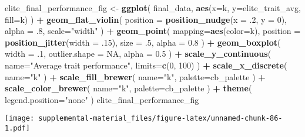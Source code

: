 \documentclass[]{book}
\newenvironment{Shaded}{\begin{snugshade}}{\end{snugshade}}
\newcommand{\DataTypeTok}[1]{\textcolor[rgb]{0.13,0.29,0.53}{#1}}
\newcommand{\DecValTok}[1]{\textcolor[rgb]{0.00,0.00,0.81}{#1}}
\newcommand{\FloatTok}[1]{\textcolor[rgb]{0.00,0.00,0.81}{#1}}
\newcommand{\KeywordTok}[1]{\textcolor[rgb]{0.13,0.29,0.53}{\textbf{#1}}}
\newcommand{\NormalTok}[1]{#1}
\newcommand{\OperatorTok}[1]{\textcolor[rgb]{0.81,0.36,0.00}{\textbf{#1}}}
\newcommand{\OtherTok}[1]{\textcolor[rgb]{0.56,0.35,0.01}{#1}}
\newcommand{\StringTok}[1]{\textcolor[rgb]{0.31,0.60,0.02}{#1}}
\begin{document}
\begin{Shaded}
\begin{Highlighting}[]
\NormalTok{elite_final_performance_fig <-}\StringTok{ }\KeywordTok{ggplot}\NormalTok{(}
\NormalTok{    final_data,}
    \KeywordTok{aes}\NormalTok{(}\DataTypeTok{x=}\NormalTok{k, }\DataTypeTok{y=}\NormalTok{elite_trait_avg, }\DataTypeTok{fill=}\NormalTok{k)}
\NormalTok{  ) }\OperatorTok{+}
\StringTok{  }\KeywordTok{geom_flat_violin}\NormalTok{(}
    \DataTypeTok{position =} \KeywordTok{position_nudge}\NormalTok{(}\DataTypeTok{x =} \FloatTok{.2}\NormalTok{, }\DataTypeTok{y =} \DecValTok{0}\NormalTok{),}
    \DataTypeTok{alpha =} \FloatTok{.8}\NormalTok{,}
    \DataTypeTok{scale=}\StringTok{"width"}
\NormalTok{  ) }\OperatorTok{+}
\StringTok{  }\KeywordTok{geom_point}\NormalTok{(}
    \DataTypeTok{mapping=}\KeywordTok{aes}\NormalTok{(}\DataTypeTok{color=}\NormalTok{k),}
    \DataTypeTok{position =} \KeywordTok{position_jitter}\NormalTok{(}\DataTypeTok{width =} \FloatTok{.15}\NormalTok{),}
    \DataTypeTok{size =} \FloatTok{.5}\NormalTok{,}
    \DataTypeTok{alpha =} \FloatTok{0.8}
\NormalTok{  ) }\OperatorTok{+}
\StringTok{  }\KeywordTok{geom_boxplot}\NormalTok{(}
    \DataTypeTok{width =} \FloatTok{.1}\NormalTok{,}
    \DataTypeTok{outlier.shape =} \OtherTok{NA}\NormalTok{,}
    \DataTypeTok{alpha =} \FloatTok{0.5}
\NormalTok{  ) }\OperatorTok{+}
\StringTok{  }\KeywordTok{scale_y_continuous}\NormalTok{(}
    \DataTypeTok{name=}\StringTok{"Average trait performance"}\NormalTok{,}
    \DataTypeTok{limits=}\KeywordTok{c}\NormalTok{(}\DecValTok{0}\NormalTok{, }\DecValTok{100}\NormalTok{)}
\NormalTok{  ) }\OperatorTok{+}
\StringTok{  }\KeywordTok{scale_x_discrete}\NormalTok{(}
    \DataTypeTok{name=}\StringTok{"k"}
\NormalTok{  ) }\OperatorTok{+}
\StringTok{  }\KeywordTok{scale_fill_brewer}\NormalTok{(}
    \DataTypeTok{name=}\StringTok{"k"}\NormalTok{,}
    \DataTypeTok{palette=}\NormalTok{cb_palette}
\NormalTok{  ) }\OperatorTok{+}
\StringTok{  }\KeywordTok{scale_color_brewer}\NormalTok{(}
    \DataTypeTok{name=}\StringTok{"k"}\NormalTok{,}
    \DataTypeTok{palette=}\NormalTok{cb_palette}
\NormalTok{  ) }\OperatorTok{+}
\StringTok{  }\KeywordTok{theme}\NormalTok{(}
    \DataTypeTok{legend.position=}\StringTok{"none"}
\NormalTok{  )}
\NormalTok{elite_final_performance_fig}
\end{Highlighting}
\end{Shaded}

\texttt{[image: supplemental-material\_files/figure-latex/unnamed-chunk-86-1.pdf]}
\end{document}
